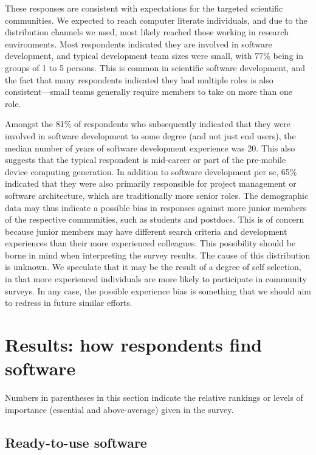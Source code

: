 \documentclass{casicswhitepaper}
\begin{document}
These responses are consistent with expectations for the targeted scientific communities.  We expected to reach computer literate individuals, and due to the distribution channels we used, most likely reached those working in research environments.  Most respondents indicated they are involved in software development, and typical development team sizes were small, with 77\% being in groups of 1 to 5 persons.  This is common in scientific software development, and the fact that many respondents indicated they had multiple roles is also consistent---small teams generally require members to take on more than one role.

Amongst the 81\% of respondents who subsequently indicated that they were involved in software development to some degree (and not just end users), the median number of years of software development experience was 20. This also suggests that the typical respondent is mid-career or part of the pre-mobile device computing generation. In addition to software development per se, 65\% indicated that they were also primarily responsible for project management or software architecture, which are traditionally more senior roles.  The demographic data may thus indicate a possible bias in responses against more junior members of the respective communities, such as students and postdocs.  This is of concern because junior members may have different search criteria and development experiences than their more experienced colleagues. This possibility should be borne in mind when interpreting the survey results. The cause of this distribution is unknown.  We speculate that it may be the result of a degree of self selection, in that more experienced individuals are more likely to participate in community surveys.  In any case, the possible experience bias is something that we should aim to redress in future similar efforts.


\section{Results: how respondents find software}

Numbers in parentheses in this section indicate the relative rankings or levels of importance (essential and above-average) given in the survey.


\subsection{Ready-to-use software}
 
\end{document}
